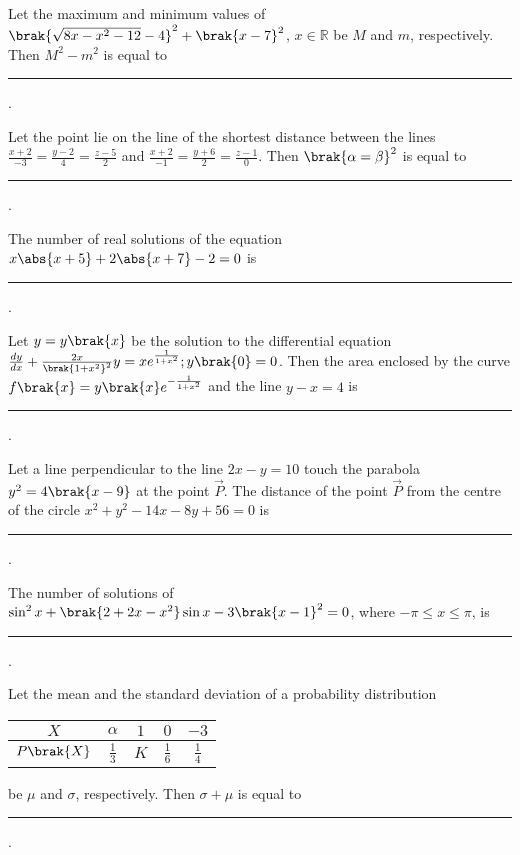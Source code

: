 \iffalse
\title{2024}
\author{EE24Btech11024}
\section{integer}
\fi

\item Let the maximum and minimum values of $\brak{\sqrt{8x-x^2-12}-4}^2+\brak{x-7}^2$, $x\in\mathbb{R}$ be $M$ and $m$, respectively. Then $M^2-m^2$ is equal to \rule{1cm}{0.15mm}.

\hfill{}

\item Let the point  lie on the line of the shortest distance between the lines $\frac{x+2}{-3}=\frac{y-2}{4}=\frac{z-5}{2}$ and $\frac{x+2}{-1}=\frac{y+6}{2}=\frac{z-1}{0}$. Then $\brak{\alpha=\beta}^2$ is equal to \rule{1cm}{0.15mm}.

\hfill{}

\item The number of real solutions of the equation $x\abs{x+5}+2\abs{x+7}-2=0$ is \rule{1cm}{0.15mm}.

\hfill{}

\item Let $y=y\brak{x}$ be the solution to the differential equation $\frac{dy}{dx}+\frac{2x}{\brak{1+x^2}^2}y=xe^{\frac{1}{1+x^2}};y\brak{0}=0$. Then the area enclosed by the curve $f\brak{x}=y\brak{x}e^{-\frac{1}{1+x^2}}$ and the line $y-x=4$ is \rule{1cm}{0.15mm}.

\hfill{}

\item Let a line perpendicular to the line $2x-y=10$ touch the parabola $y^2=4\brak{x-9}$ at the point $\vec{P}$. The distance of the point $\vec{P}$ from the centre of the circle $x^2+y^2-14x-8y+56=0$ is \rule{1cm}{0.15mm}.

\hfill{}

\item The number of solutions of $\sin^{2}x+\brak{2+2x-x^2}\sin x - 3\brak{x-1}^2=0$, where $-\pi\leq x\leq \pi$, is \rule{1cm}{0.15mm}.

\hfill{}

\item Let the mean and the standard deviation of a probability distribution\\
\begin{center}
   \begin{tabular}[12pt]{ |c|c|c|c|c|}
    \hline
    $X$ & $\alpha$ & $1$ & $0$ & $-3$\\
    \hline
    $P\brak{X}$ & $\frac{1}{3}$ & $K$ & $\frac{1}{6}$ & $\frac{1}{4}$\\
    \hline
    \end{tabular}
\end{center}
be $\mu$ and $\sigma$, respectively. Then $\sigma+\mu$ is equal to \rule{1cm}{0.15mm}.

